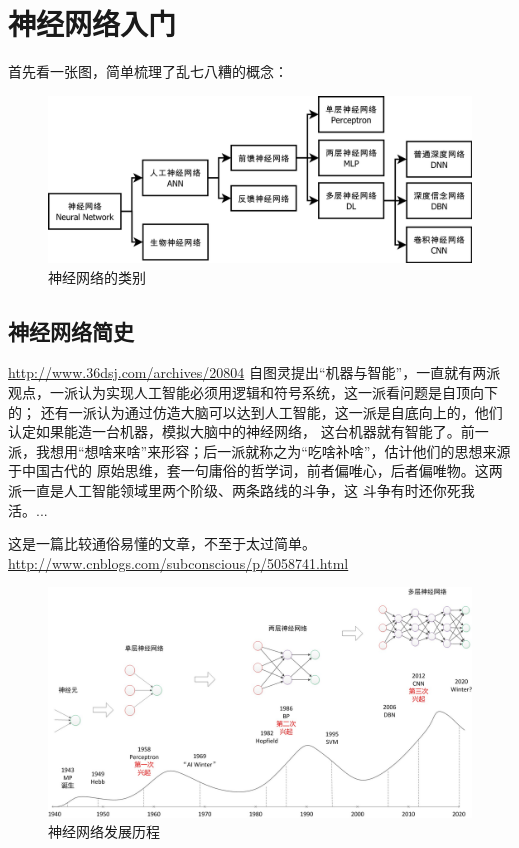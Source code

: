 \chapter{神经网络入门}
首先看一张图，简单梳理了乱七八糟的概念：
\begin{figure}
  \centering
  \includegraphics[width=18cm]{Figures/神经网络的类别.svg}
  \caption{神经网络的类别}\label{神经网络的类别}
\end{figure}

\section{神经网络简史}
\url{http://www.36dsj.com/archives/20804}
自图灵提出“机器与智能”，一直就有两派观点，一派认为实现人工智能必须用逻辑和符号系统，这一派看问题是自顶向下的；
还有一派认为通过仿造大脑可以达到人工智能，这一派是自底向上的，他们认定如果能造一台机器，模拟大脑中的神经网络，
这台机器就有智能了。前一派，我想用“想啥来啥”来形容；后一派就称之为“吃啥补啥”，估计他们的思想来源于中国古代的
原始思维，套一句庸俗的哲学词，前者偏唯心，后者偏唯物。这两派一直是人工智能领域里两个阶级、两条路线的斗争，这
斗争有时还你死我活。...


这是一篇比较通俗易懂的文章，不至于太过简单。\url{http://www.cnblogs.com/subconscious/p/5058741.html}
\begin{figure}
  \centering
  \includegraphics[width=15cm]{Figures/神经网络发展历程.jpg}
  \caption{神经网络发展历程}\label{神经网络发展历程}
\end{figure}

